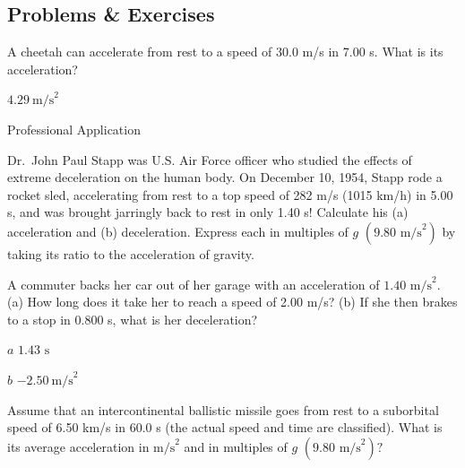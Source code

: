 \documentclass[
]{book}
\newenvironment{problems-exercises}{}{}
\newenvironment{tinysection}{}{}
\begin{document}
\hypertarget{fs-id4129894}{}
\begin{problems-exercises}

\hypertarget{problems-exercises-2}{%
\subsection{Problems \& Exercises}\label{problems-exercises-2}}

\hypertarget{fs-id4129901}{}
\leavevmode\hypertarget{fs-id4129903}{}%
A cheetah can accelerate from rest to a speed of 30.0 m/s in 7.00 s.
What is its acceleration?

\leavevmode\hypertarget{fs-id4059926}{}%
\({4\text{.}\text{29}\ \text{m/s}^{2}}{}\)

\hypertarget{fs-id4035192}{}
\hypertarget{fs-id4035194}{}
\begin{tinysection}

{Professional Application}

\end{tinysection}

Dr.~John Paul Stapp was U.S. Air Force officer who studied the effects
of extreme deceleration on the human body. On December 10, 1954, Stapp
rode a rocket sled, accelerating from rest to a top speed of 282 m/s
(1015 km/h) in 5.00 s, and was brought jarringly back to rest in only
1.40 s! Calculate his (a) acceleration and (b) deceleration. Express
each in multiples of \(g{}\) \({(9\text{.}\text{80\ m}\text{/s}^{2})}{}\) by
taking its ratio to the acceleration of gravity.

\hypertarget{fs-id2299988}{}
\leavevmode\hypertarget{fs-id2299990}{}%
A commuter backs her car out of her garage with an acceleration of
\({1\text{.}\text{40\ m/s}^{2}}{}\). (a) How long does it take her to
reach a speed of 2.00 m/s? (b) If she then brakes to a stop in 0.800 s,
what is her deceleration?

\leavevmode\hypertarget{fs-id4124023}{}%
\(a\) \({1\text{.}\text{43\ s}}{}\)

\(b\) \({{- 2}\text{.}\text{50}\ \text{m/s}^{2}}{}\)

\hypertarget{fs-id4124470}{}
\leavevmode\hypertarget{fs-id4124472}{}%
Assume that an intercontinental ballistic missile goes from rest to a
suborbital speed of 6.50 km/s in 60.0 s (the actual speed and time are
classified). What is its average acceleration in \(\text{m/s}^{2}{}\) and
in multiples of \(g{}\) \({{(9\text{.}\text{80\ m}\text{/s}^{2})}?}{}\)

\end{problems-exercises}
\end{document}
